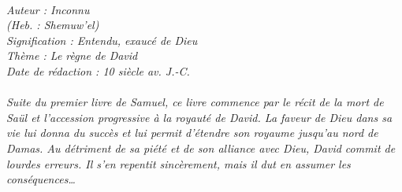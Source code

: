 \BFont
\noindent\hrulefill
{\footnotesize
\textit{
\bigskip
{\centering{}
\\Auteur : Inconnu
\\(Heb. : Shemuw'el)
\\Signification : Entendu, exaucé de Dieu
\\Thème : Le règne de David
\\Date de rédaction : 10 siècle av. J.-C.\\}
}
\textit{
\\Suite du premier livre de Samuel, ce livre commence par le récit de la mort de Saül et l'accession progressive à la royauté de David. La faveur de Dieu dans sa vie lui donna du succès et lui permit d'étendre son royaume jusqu'au nord de Damas. Au détriment de sa piété et de son alliance avec Dieu, David commit de lourdes erreurs. Il s'en repentit sincèrement, mais il dut en assumer les conséquences…\bigskip
}
}
\par\nobreak\noindent\hrulefill
